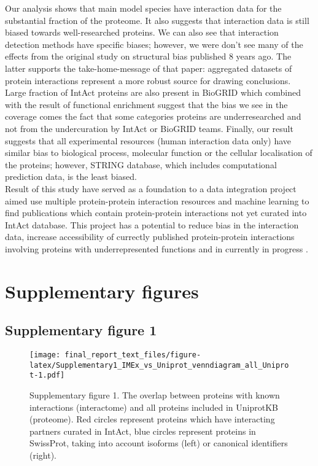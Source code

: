 \documentclass[12pt,]{report}
\begin{document}
Our analysis shows that main model species have interaction data for the
substantial fraction of the proteome. It also suggests that interaction
data is still biased \citep{Rolland:2014aa} towards well-researched
proteins. We can also see that interaction detection methods have
specific biases; however, we were don't see many of the effects from the
original study on structural bias published 8 years
ago\citep{Bjorklund:2008aa}. The latter supports the take-home-message
of that paper: aggregated datasets of protein interactions represent a
more robust source for drawing conclusions. Large fraction of IntAct
proteins are also present in BioGRID which combined with the result of
functional enrichment suggest that the bias we see in the coverage comes
the fact that some categories proteins are underresearched and not from
the undercuration by IntAct or BioGRID teams. Finally, our result
suggests that all experimental resources (human interaction data only)
have similar bias to biological process, molecular function or the
cellular localisation of the proteins; however, STRING database, which
includes computational prediction data, is the least biased.\\
Result of this study have served as a foundation to a data integration
project aimed use multiple protein-protein interaction resources and
machine learning to find publications which contain protein-protein
interactions not yet curated into IntAct database. This project has a
potential to reduce bias in the interaction data, increase accessibility
of currectly published protein-protein interactions involving proteins
with underrepresented functions and in currently in progress
\citep{PPorras2017}.

\chapter{Supplementary figures}\label{supplementary-figures}

\section{Supplementary figure 1}\label{supplementary-figure-1}

\begin{figure}
\centering
\texttt{[image: final\_report\_text\_files/figure-latex/Supplementary1\_IMEx\_vs\_Uniprot\_venndiagram\_all\_Uniprot-1.pdf]}
\caption{Supplementary figure 1. The overlap between proteins with known
interactions (interactome) and all proteins included in UniprotKB
(proteome). Red circles represent proteins which have interacting
partners curated in IntAct, blue circles represent proteins in
SwissProt, taking into account isoforms (left) or canonical identifiers
(right).}
\end{figure}
\end{document}
